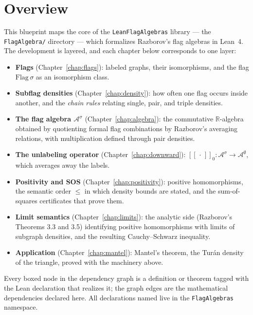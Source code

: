 \chapter{Overview}
\label{chap:overview}

This blueprint maps the core of the \texttt{LeanFlagAlgebras} library --- the
\texttt{FlagAlgebra/} directory --- which formalizes Razborov's flag algebras in
Lean~4. The development is layered, and each chapter below corresponds to one
layer:

\begin{itemize}
  \item \textbf{Flags} (Chapter~\ref{chap:flags}): labeled graphs, their
    isomorphisms, and the flag $\mathrm{Flag}\,\sigma$ as an isomorphism class.
  \item \textbf{Subflag densities} (Chapter~\ref{chap:density}): how often one
    flag occurs inside another, and the \emph{chain rules} relating single,
    pair, and triple densities.
  \item \textbf{The flag algebra $\mathcal{A}^\sigma$} (Chapter~\ref{chap:algebra}):
    the commutative $\mathbb{R}$-algebra obtained by quotienting formal flag
    combinations by Razborov's averaging relations, with multiplication defined
    through pair densities.
  \item \textbf{The unlabeling operator} (Chapter~\ref{chap:downward}):
    $[\![\,\cdot\,]\!]_0 : \mathcal{A}^\sigma \to \mathcal{A}^\emptyset$, which
    averages away the labels.
  \item \textbf{Positivity and SOS} (Chapter~\ref{chap:positivity}): positive
    homomorphisms, the semantic order $\le$ in which density bounds are stated,
    and the sum-of-squares certificates that prove them.
  \item \textbf{Limit semantics} (Chapter~\ref{chap:limits}): the analytic side
    (Razborov's Theorems 3.3 and 3.5) identifying positive homomorphisms with
    limits of subgraph densities, and the resulting Cauchy--Schwarz inequality.
  \item \textbf{Application} (Chapter~\ref{chap:mantel}): Mantel's theorem, the
    Tur\'an density of the triangle, proved with the machinery above.
\end{itemize}

Every boxed node in the dependency graph is a definition or theorem tagged with
the Lean declaration that realizes it; the graph edges are the mathematical
dependencies declared here. All declarations named live in the \texttt{FlagAlgebras}
namespace.
